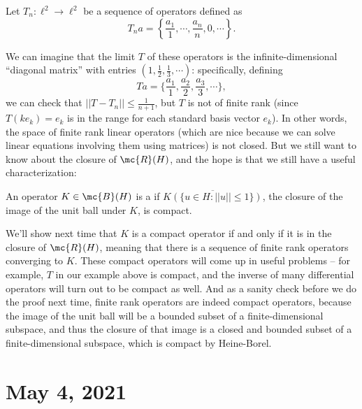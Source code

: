 \begin{example}
Let $T_n: \ell^2 \to \ell^2$ be a sequence of operators defined as 
\[
    T_n a = \left\{\frac{a_1}{1}, \cdots, \frac{a_n}{n}, 0, \cdots\right\}.
\]
\end{example}

We can imagine that the limit $T$ of these operators is the infinite-dimensional ``diagonal matrix'' with entries $(1, \frac{1}{2}, \frac{1}{3}, \cdots)$: specifically, defining
\[
    Ta = \{\frac{a_1}{1}, \frac{a_2}{2}, \frac{a_3}{3}, \cdots\},
\]
we can check that $||T - T_n|| \le \frac{1}{n+1}$, but $T$ is not of finite rank (since $T(ke_k) = e_k$ is in the range for each standard basis vector $e_k$). In other words, the space of finite rank linear operators (which are nice because we can solve linear equations involving them using matrices) is not closed. But we still want to know about the closure of $\mc{R}(H)$, and the hope is that we still have a useful characterization:

\begin{definition}
An operator $K \in \mc{B}(H)$ is a  if $\overline{K(\{u \in H: ||u|| \le 1\})}$, the closure of the image of the unit ball under $K$, is compact.
\end{definition}

We'll show next time that $K$ is a compact operator if and only if it is in the closure of $\mc{R}(H)$, meaning that there is a sequence of finite rank operators converging to $K$. These compact operators will come up in useful problems -- for example, $T$ in our example above is compact, and the inverse of many differential operators will turn out to be compact as well. And as a sanity check before we do the proof next time, finite rank operators are indeed compact operators, because the image of the unit ball will be a bounded subset of a finite-dimensional subspace, and thus the closure of that image is a closed and bounded subset of a finite-dimensional subspace, which is compact by Heine-Borel.


\pagebreak\section*{May 4, 2021}

